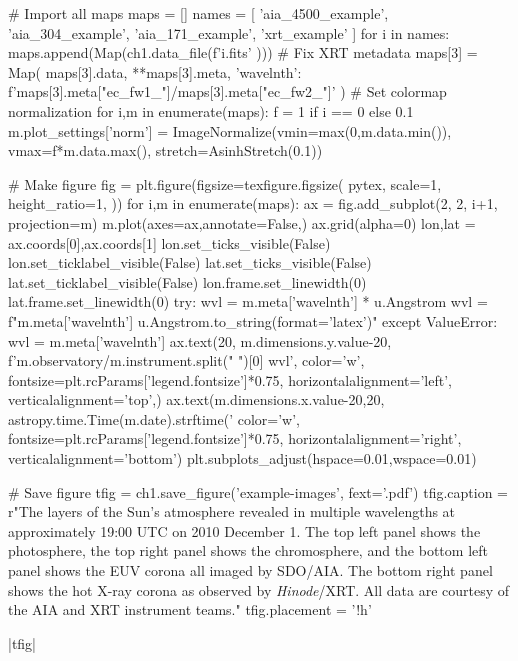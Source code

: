 \begin{pycode}[chapter1]
# Import all maps
maps = []
names = [
    'aia_4500_example',
    'aia_304_example',
    'aia_171_example',
    'xrt_example'
]
for i in names:
    maps.append(Map(ch1.data_file(f'{i}.fits' )))
# Fix XRT metadata
maps[3] = Map(
    maps[3].data,
    {**maps[3].meta, 'wavelnth': f'{maps[3].meta["ec_fw1_"]}/{maps[3].meta["ec_fw2_"]}'}
)
# Set colormap normalization
for i,m in enumerate(maps):
    f = 1 if i == 0 else 0.1
    m.plot_settings['norm'] = ImageNormalize(vmin=max(0,m.data.min()),
                                             vmax=f*m.data.max(),
                                             stretch=AsinhStretch(0.1))

# Make figure
fig = plt.figure(figsize=texfigure.figsize(
    pytex,
    scale=1,
    height_ratio=1,
))
for i,m in enumerate(maps):
    ax = fig.add_subplot(2, 2, i+1, projection=m)
    m.plot(axes=ax,annotate=False,)
    ax.grid(alpha=0)
    lon,lat = ax.coords[0],ax.coords[1]
    lon.set_ticks_visible(False)
    lon.set_ticklabel_visible(False)
    lat.set_ticks_visible(False)
    lat.set_ticklabel_visible(False)
    lon.frame.set_linewidth(0)
    lat.frame.set_linewidth(0)
    try:
        wvl = m.meta['wavelnth'] * u.Angstrom
        wvl = f"{m.meta['wavelnth']} {u.Angstrom.to_string(format='latex')}"
    except ValueError:
        wvl = m.meta['wavelnth']
    ax.text(20, m.dimensions.y.value-20,
            f'{m.observatory}/{m.instrument.split(" ")[0]} {wvl}',
            color='w',
            fontsize=plt.rcParams['legend.fontsize']*0.75,
            horizontalalignment='left',
            verticalalignment='top',)
    ax.text(m.dimensions.x.value-20,20,
            astropy.time.Time(m.date).strftime('%
            color='w',
            fontsize=plt.rcParams['legend.fontsize']*0.75,
            horizontalalignment='right',
            verticalalignment='bottom')
plt.subplots_adjust(hspace=0.01,wspace=0.01)

# Save figure
tfig = ch1.save_figure('example-images', fext='.pdf')
tfig.caption = r"The layers of the Sun's atmosphere revealed in multiple wavelengths at approximately 19:00 UTC on 2010 December 1. The top left panel shows the photosphere, the top right panel shows the chromosphere, and the bottom left panel shows the EUV corona all imaged by SDO/AIA. The bottom right panel shows the hot X-ray corona as observed by \textit{Hinode}/XRT. All data are courtesy of the AIA and XRT instrument teams."
tfig.placement = '!h'
\end{pycode}
\py[chapter1]|tfig|

